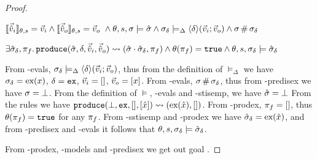\begin{proof}
\pfassume \begin{hypvlist}
 $\llbracket\vec{\hat{v}}_i\rrbracket_{\theta,s}=\vec{v}_i \land \llbracket\vec{\hat{v}}_o\rrbracket_{\theta,s}=\vec{v}_o~\land \theta,s,\sigma\models\hat{\sigma} \land \sigma_\delta \models_\Delta \left<\delta\right>\!(\vec{v}_i;\vec{v}_o) \land \sigma \operatorname{\#} \sigma_\delta$
\end{hypvlist}
\pfprove \begin{goalvlist}
 $\exists\hat{\sigma}_\delta,\pi_f\ldotp \texttt{produce}(\hat{\sigma},\delta,\vec{\hat{v}}_i,\vec{\hat{v}}_o)\rightsquigarrow (\hat{\sigma}\cdot\hat{\sigma}_\delta,\pi_f) \land \theta(\pi_f) = \texttt{true}  \land \theta,s,\sigma_\delta\models\hat{\sigma}_\delta$
\end{goalvlist}
\begin{hypvlist}
 From \hyp{evals}, $\sigma_\delta\models_\Delta \left<\delta\right>\!(\vec{v}_i;\vec{v}_o)$, thus from the definition of $\models_\Delta$ we have $\sigma_\delta=\text{ex}(x)$, $\delta=\texttt{ex}$, $\vec{v}_i=[]$, $\vec{v}_o=[x]$.
 From \hyp{evals}, $\sigma\operatorname{\#}\sigma_\delta$, thus from \hyp{predisex} we have $\sigma=\bot$.
 From the definition of $\models$, \hyp{evals} and \hyp{stisemp}, we have $\hat{\sigma}=\bot$
 From the \produce{} rules we have $\texttt{produce}(\bot,\texttt{ex},[], [\hat{x}])\rightsquigarrow (\text{ex}(\hat{x}),[])$.
 From \hyp{prodex}, $\pi_f=[]$, thus $\theta(\pi_f)=\texttt{true}$ for any $\pi_f$.
 From \hyp{sstisemp} and \hyp{prodex} we have $\hat{\sigma}_\delta=\text{ex}(\hat{x})$, and from \hyp{predisex} and \hyp{evals} it follows that ${\theta,s,\sigma_\delta\models\hat{\sigma}_\delta}$.
\end{hypvlist}
From \hyp{prodex}, \hyp{models} and \hyp{predisex} we get out goal .

\end{proof}












